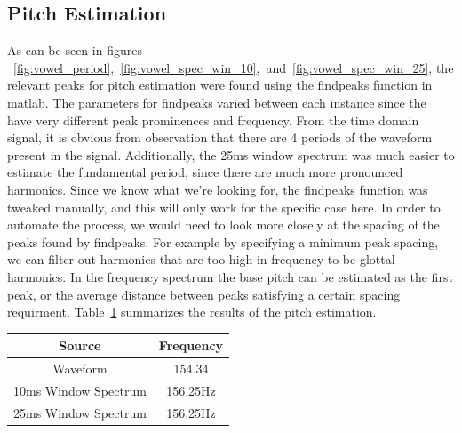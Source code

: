 \documentclass{article}
\begin{document}
\subsection{Pitch Estimation} %
\label{sub:pitch_estimation}
As can be seen in figures ~\ref{fig:vowel_period},~\ref{fig:vowel_spec_win_10},~and~\ref{fig:vowel_spec_win_25}, the relevant peaks for pitch estimation were found using the findpeaks function in matlab. The parameters for findpeaks varied between each instance since the have very different peak prominences and frequency. From the time domain signal, it is obvious from observation that there are 4 periods of the waveform present in the signal. Additionally, the 25ms window spectrum was much easier to estimate the fundamental period, since there are much more pronounced harmonics. Since we know what we're looking for, the findpeaks function was tweaked manually, and this will only work for the specific case here. In order to automate the process, we would need to look more closely at the spacing of the peaks found by findpeaks. For example by specifying a minimum peak spacing, we can filter out harmonics that are too high in frequency to be glottal harmonics. In the frequency spectrum the base pitch can be estimated as the first peak, or the average distance between peaks satisfying a certain spacing requirment. Table~\ref{tab:pitch_est} summarizes the results of the pitch estimation.
\begin{table}
\begin{tabular}{cc}
\hline
Source & Frequency\\
\hline
Waveform & 154.34\\
10ms Window Spectrum & 156.25Hz\\
25ms Window Spectrum & 156.25Hz\\
\hline
\end{tabular}
\label{tab:pitch_est}
\end{table}
\FloatBarrier
\end{document}
